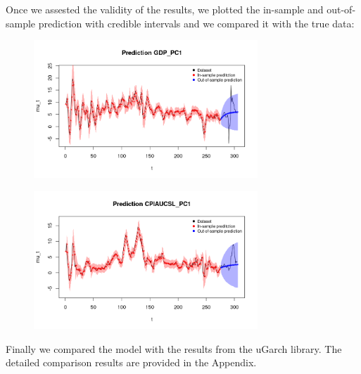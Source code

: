Once we assested the validity of the results, we plotted the in-sample and out-of-sample prediction with credible intervals and we compared it with the true data:
\begin{figure}[H]
    \centering
    \includegraphics[width=0.75\textwidth]{images/5-GARCH/gdp_prediction.png}
    \label{fig:GARCH_first}
\end{figure}
\begin{figure}[H]
    \centering
    \includegraphics[width=0.75\textwidth]{images/5-GARCH/infl_prediction.png}
    \label{fig:GARCH_second}
\end{figure}
Finally we compared the model with the results from the uGarch library. The detailed comparison results are provided in the Appendix. 